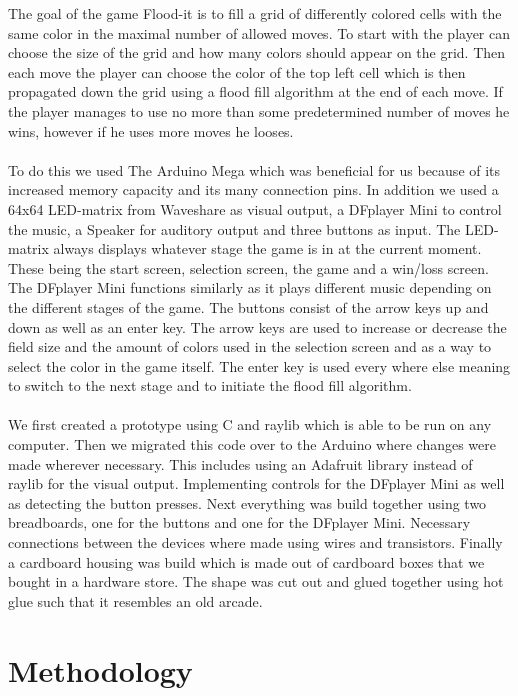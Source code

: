 \documentclass[12pt, a4paper]{article}
\begin{document}
The goal of the game Flood-it is to fill a grid of differently colored cells with the same color in the maximal number of allowed moves. To start with the player can choose the size of the grid and how many colors should appear on the grid. Then each move the player can choose the color of the top left cell which is then propagated down the grid using a flood fill algorithm at the end of each move. If the player manages to use no more than some predetermined number of moves he wins, however if he uses more moves he looses.\\\\
To do this we used The Arduino Mega which was beneficial for us because of its increased memory capacity and its many connection pins. In addition we used a 64x64 LED-matrix from Waveshare as visual output, a DFplayer Mini to control the music, a Speaker for auditory output and three buttons as input. The LED-matrix always displays whatever stage the game is in at the current moment. These being the start screen, selection screen, the game and a win/loss screen. The DFplayer Mini functions similarly as it plays different music depending on the different stages of the game. The buttons consist of the arrow keys up and down as well as an enter key. The arrow keys are used to increase or decrease the field size and the amount of colors used in the selection screen and as a way to select the color in the game itself. The enter key is used every where else meaning to switch to the next stage and to initiate the flood fill algorithm.\\\\
We first created a prototype using C and raylib which is able to be run on any computer. Then we migrated this code over to the Arduino where changes were made wherever necessary. This includes using an Adafruit library instead of raylib for the visual output. Implementing controls for the DFplayer Mini as well as detecting the button presses. Next everything was build together using two breadboards, one for the buttons and one for the DFplayer Mini. Necessary connections between the devices where made using wires and transistors. Finally a cardboard housing was build which is made out of cardboard boxes that we bought in a hardware store. The shape was cut out and glued together using hot glue such that it resembles an old arcade.

\section*{Methodology}
\end{document}
